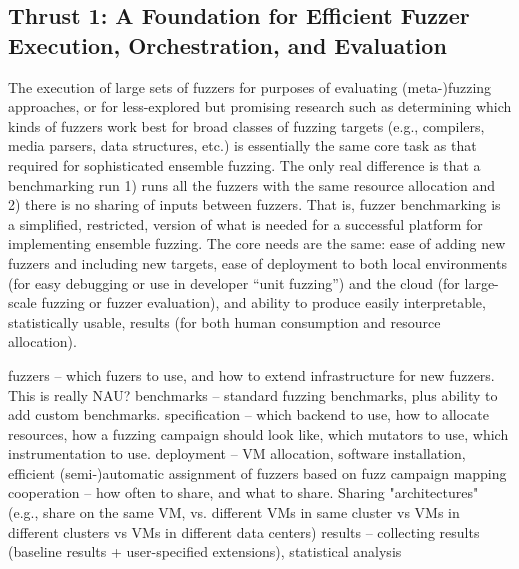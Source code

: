 \subsection{Thrust 1: A Foundation for Efficient Fuzzer Execution,
Orchestration, and Evaluation}

The execution of large sets of fuzzers for purposes of evaluating
(meta-)fuzzing approaches, or for less-explored but promising research such as
determining which kinds of fuzzers work best for broad classes of fuzzing
targets (e.g., compilers, media parsers, data structures, etc.) is essentially
the same core task as that required for sophisticated ensemble fuzzing.  The
only real difference is that a benchmarking run 1) runs all the fuzzers with
the same resource allocation and 2) there is no sharing of inputs between
fuzzers.  That is, fuzzer benchmarking is a simplified, restricted, version of
what is needed for a successful platform for implementing ensemble fuzzing.
The core needs are the same: ease of adding new fuzzers and including new
targets, ease of deployment to both local environments (for easy debugging or
use in developer ``unit fuzzing'') and the cloud (for large-scale fuzzing or
fuzzer evaluation), and ability to produce easily interpretable, statistically
usable, results (for both human consumption and resource allocation).


fuzzers -- which fuzers to use, and how to extend infrastructure for new fuzzers.  This is really NAU?
benchmarks -- standard fuzzing benchmarks, plus ability to add custom benchmarks.
specification -- which backend to use, how to allocate resources, how a fuzzing campaign should look like, which mutators to use, which instrumentation to use.
deployment -- VM allocation, software installation, efficient (semi-)automatic assignment of fuzzers based on fuzz campaign mapping
cooperation -- how often to share, and what to share.  Sharing "architectures" (e.g., share on the same VM, vs. different VMs in same cluster vs VMs in different clusters vs VMs in different data centers)
results -- collecting results (baseline results + user-specified extensions), statistical analysis


